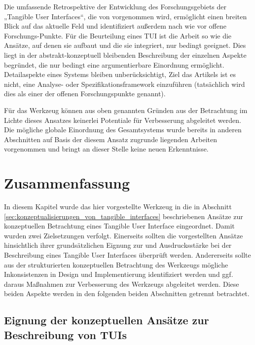 Die umfassende Retrospektive der Entwicklung des Forschungsgebiets der „Tangible User Interfaces“, die von \citep{Ishii08} vorgenommen wird, ermöglicht einen breiten Blick auf das aktuelle Feld und identifiziert außerdem nach wie vor offene Forschungs-Punkte. Für die Beurteilung eines \gls{TUI} ist die Arbeit so wie die Ansätze, auf denen sie aufbaut und die sie integriert, nur bedingt geeignet. Dies liegt in der abstrakt-konzeptuell bleibenden Beschreibung der einzelnen Aspekte begründet, die nur bedingt eine argumentierbare Einordnung ermöglicht. Detailaspekte eines Systems bleiben unberücksichtigt, Ziel das Artikels ist es nicht, eine Analyse- oder Spezifikationsframework einzuführen (tatsächlich wird dies als einer der offenen Forschungspunkte genannt).

Für das Werkzeug können aus oben genannten Gründen aus der Betrachtung im Lichte dieses Ansatzes keinerlei Potentiale für 
Verbesserung abgeleitet werden. Die mögliche globale Einordnung des Gesamtsystems wurde bereits in anderen Abschnitten auf Basis der diesem Ansatz zugrunde liegenden Arbeiten vorgenommen und bringt an dieser Stelle keine neuen Erkenntnisse.


\section{Zusammenfassung} %
\label{sec:konz_eval_zusammenfassung}

In diesem Kapitel wurde das hier vorgestellte Werkzeug in die in Abschnitt \ref{sec:konzeptualisierungen_von_tangible_interfaces} beschriebenen Ansätze zur konzeptuellen Betrachtung eines Tangible User Interface eingeordnet. Damit wurden zwei Zielsetzungen verfolgt. Einerseits sollten die vorgestellten Ansätze hinsichtlich ihrer grundsätzlichen Eignung zur und Ausdrucksstärke bei der Beschreibung eines Tangible User Interfaces überprüft werden. Andererseits sollte aus der strukturierten konzeptuellen Betrachtung des Werkzeugs mögliche Inkonsistenzen in Design und Implementierung identifiziert werden und ggf. daraus Maßnahmen zur Verbesserung des Werkzeugs abgeleitet werden. Diese beiden Aspekte werden in den folgenden beiden Abschnitten getrennt betrachtet.

\subsection{Eignung der konzeptuellen Ansätze zur Beschreibung von TUIs} %
\label{sub:eignung_der_konzeptuellen_ansätze}

